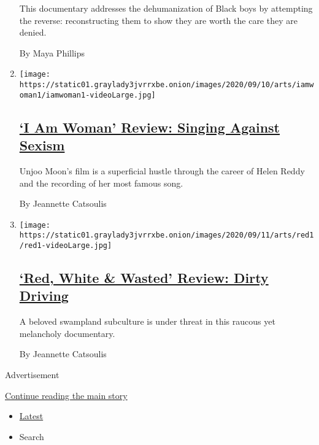 \begin{enumerate}
  This documentary addresses the dehumanization of Black boys by
  attempting the reverse: reconstructing them to show they are worth the
  care they are denied.

  By Maya Phillips
\item
  \texttt{[image: https://static01.graylady3jvrrxbe.onion/images/2020/09/10/arts/iamwoman1/iamwoman1-videoLarge.jpg]}

  \hypertarget{i-am-woman-review-singing-against-sexism}{%
  \subsection{\texorpdfstring{\href{/2020/09/10/movies/i-am-woman-review.html}{`I
  Am Woman' Review: Singing Against
  Sexism}}{`I Am Woman' Review: Singing Against Sexism}}\label{i-am-woman-review-singing-against-sexism}}

  Unjoo Moon's film is a superficial hustle through the career of Helen
  Reddy and the recording of her most famous song.

  By Jeannette Catsoulis
\item
  \texttt{[image: https://static01.graylady3jvrrxbe.onion/images/2020/09/11/arts/red1/red1-videoLarge.jpg]}

  \hypertarget{red-white--wasted-review-dirty-driving}{%
  \subsection{\texorpdfstring{\href{/2020/09/10/movies/red-white-wasted-review.html}{`Red,
  White \& Wasted' Review: Dirty
  Driving}}{`Red, White \& Wasted' Review: Dirty Driving}}\label{red-white--wasted-review-dirty-driving}}

  A beloved swampland subculture is under threat in this raucous yet
  melancholy documentary.

  By Jeannette Catsoulis
\end{enumerate}

Advertisement

\protect\hyperlink{after-mid1}{Continue reading the main story}

\begin{itemize}
\tightlist
\item
  \protect\hyperlink{stream-panel}{Latest}
\item
  Search
\end{itemize}

